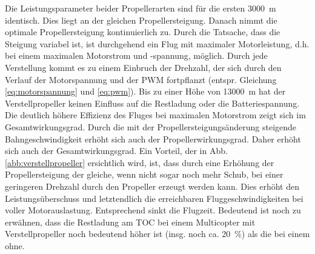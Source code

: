 Die Leistungsparameter beider Propellerarten sind für die ersten \SI{3000}{m} identisch. Dies liegt an der gleichen Propellersteigung. Danach nimmt die optimale Propellersteigung kontinuierlich zu. Durch die Tatsache, dass die Steigung variabel ist, ist durchgehend ein Flug mit maximaler Motorleistung, d.h. bei einem maximalen Motorstrom und -spannung, möglich. Durch jede Verstellung kommt es zu einem Einbruch der Drehzahl, der sich durch den Verlauf der Motorspannung und der PWM fortpflanzt (entspr. Gleichung \ref{eq:motorspannung} und \ref{eq:pwm}). Bis zu einer Höhe von \SI{13000}{m} hat der Verstellpropeller keinen Einfluss auf die Restladung oder die Batteriespannung. Die deutlich höhere Effizienz des Fluges bei maximalen Motorstrom zeigt sich im Gesamtwirkungsgrad. Durch die mit der Propellersteigungsänderung steigende Bahngeschwindigkeit erhöht sich auch der Propellerwirkungsgrad. Daher erhöht sich auch der Gesamtwirkungsgrad. 
Ein Vorteil, der in Abb. \ref{abb:verstellpropeller} ersichtlich wird, ist, dass durch eine Erhöhung der Propellersteigung der gleiche, wenn nicht sogar noch mehr Schub, bei einer geringeren Drehzahl durch den Propeller erzeugt werden kann. Dies erhöht den Leistungsüberschuss und letztendlich die erreichbaren Fluggeschwindigkeiten bei voller Motorauslastung. Entsprechend sinkt die Flugzeit.
Bedeutend ist noch zu erwähnen, dass die Restladung am TOC bei einem Multicopter mit Verstellpropeller noch bedeutend höher ist (insg. noch ca. \SI{20}{\%}) als die bei einem ohne.


